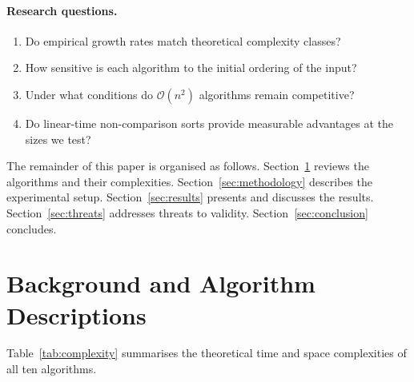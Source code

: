 \documentclass[11pt,a4paper]{article}
\begin{document}
\paragraph{Research questions.}
\begin{enumerate}[label=RQ\arabic*.]
  \item Do empirical growth rates match theoretical complexity classes?
  \item How sensitive is each algorithm to the initial ordering of the input?
  \item Under what conditions do $\mathcal{O}(n^2)$ algorithms remain competitive?
  \item Do linear-time non-comparison sorts provide measurable advantages at the
        sizes we test?
\end{enumerate}

The remainder of this paper is organised as follows.
Section~\ref{sec:background} reviews the algorithms and their complexities.
Section~\ref{sec:methodology} describes the experimental setup.
Section~\ref{sec:results} presents and discusses the results.
Section~\ref{sec:threats} addresses threats to validity.
Section~\ref{sec:conclusion} concludes.

\section{Background and Algorithm Descriptions}
\label{sec:background}

Table~\ref{tab:complexity} summarises the theoretical time and space complexities of
all ten algorithms.
\end{document}
